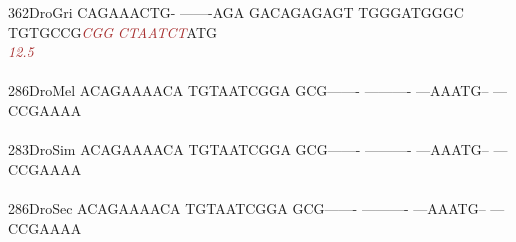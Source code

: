 \documentclass[11pt,twoside,reqno,a4paper]{article}
\begin{document}
{362\hspace*{1\charwidth}DroGri	CAGAAACTG-	-------AGA	GACAGAGAGT	TGGGATGGGC	TGTGCCG\textit{\textcolor{brown}{C}}\textit{\textcolor{brown}{G}}\textit{\textcolor{brown}{G}}	\textit{\textcolor{brown}{C}}\textit{\textcolor{brown}{T}}\textit{\textcolor{brown}{A}}\textit{\textcolor{brown}{A}}\textit{\textcolor{brown}{T}}\textit{\textcolor{brown}{C}}\textit{\textcolor{brown}{T}}ATG	\\
\hspace*{4\charwidth}\hspace*{7\charwidth}\hspace*{1\charwidth}\hspace*{1\charwidth}\hspace*{1\charwidth}\hspace*{1\charwidth}\hspace*{47\charwidth}\textit{\textcolor{brown}{12.5}}\hspace*{1\charwidth}\hspace*{1\charwidth}\\
\\
286\hspace*{1\charwidth}DroMel	ACAGAAAACA	TGTAATCGGA	GCG-------	----------	---AAATG--	---CCGAAAA	\\
\hspace*{4\charwidth}\hspace*{7\charwidth}\hspace*{1\charwidth}\hspace*{1\charwidth}\hspace*{1\charwidth}\hspace*{1\charwidth}\hspace*{1\charwidth}\hspace*{1\charwidth}\\
283\hspace*{1\charwidth}DroSim	ACAGAAAACA	TGTAATCGGA	GCG-------	----------	---AAATG--	---CCGAAAA	\\
\hspace*{4\charwidth}\hspace*{7\charwidth}\hspace*{1\charwidth}\hspace*{1\charwidth}\hspace*{1\charwidth}\hspace*{1\charwidth}\hspace*{1\charwidth}\hspace*{1\charwidth}\\
286\hspace*{1\charwidth}DroSec	ACAGAAAACA	TGTAATCGGA	GCG-------	----------	---AAATG--	---CCGAAAA	\\
}
\end{document}
